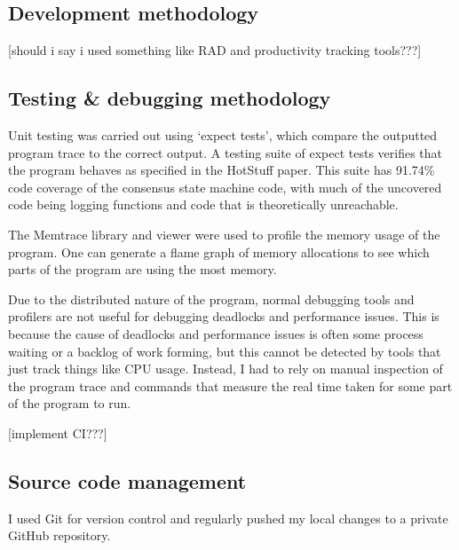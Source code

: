 \subsection{Development methodology}
[should i say i used something like RAD and productivity tracking tools???]
\subsection{Testing \& debugging methodology} \label{testing}
Unit testing was carried out using `expect tests', which compare the outputted program trace to the correct output. A testing suite of expect tests verifies that the program behaves as specified in the HotStuff paper. This suite has 91.74\% code coverage of the consensus state machine code, with much of the uncovered code being logging functions and code that is theoretically unreachable.

The Memtrace library and viewer were used to profile the memory usage of the program. One can generate a flame graph of memory allocations to see which parts of the program are using the most memory.










Due to the distributed nature of the program, normal debugging tools and profilers are not useful for debugging deadlocks and performance issues. This is because the cause of deadlocks and performance issues is often some process waiting or a backlog of work forming, but this cannot be detected by tools that just track things like CPU usage. Instead, I had to rely on manual inspection of the program trace and commands that measure the real time taken for some part of the program to run.

[implement CI???]
\subsection{Source code management}
I used Git for version control and regularly pushed my local changes to a private GitHub repository.